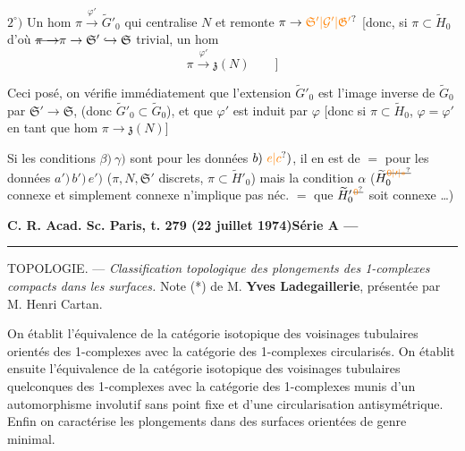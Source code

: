 \(2^\circ)\) Un hom \(\pi\xrightarrow{\varphi'}\widetilde G'_0\) qui centralise \(N\) et remonte \(\pi\to\unsure{\mathfrak{S}'|\mathcal{G}'|\mathfrak{G}'}\) [donc, si \(\pi\subset\widetilde H_0\) d'où \(\deleted{\pi\to}\pi\to\mathfrak{S}'\lhook\joinrel\to\mathfrak{S}\) trivial, un hom
\[
 \pi\xrightarrow{\varphi'}\mathfrak{z}(N)\qquad ]
\]

Ceci posé, on vérifie immédiatement que l'extension \(\widetilde G'_0\) est l'image inverse de \(\widetilde G_0\) par \(\mathfrak{S}'\to\mathfrak{S}\),  (donc \(\widetilde G'_0\subset\widetilde G_0\)), et que \(\varphi'\) est induit par \(\varphi\) [donc si \(\pi\subset\widetilde H_0\), \(\varphi=\varphi'\) en tant que hom \(\pi\to\mathfrak{z}(N)\)]

Si les conditions \deleted{\unsure{\(\alpha)\)}} \(\beta)\ \gamma)\) sont  pour les données  \(b)\ \unsure{e|c})\), il en est de \(=\) pour les données  \(a')\,b')\,e')\) (\(\pi,N,\mathfrak{S}'\) discrets, \(\pi\subset\widetilde H'_0\)) mais la condition \(\alpha\) (\(\widetilde H_0^{\deleted{\unsure{0|\prime|\ast}}}\) connexe et simplement connexe n'implique pas néc. \(=\) que \(\widetilde H'_0{}^{\deleted{\unsure{0}}}\) soit connexe \ldots)


\textbf{C. R. Acad. Sc. Paris, t. 279 (22 juillet 1974)}\hfill\textbf{Série A ---}\par\noindent\rule{\linewidth}{.35pt}\par

TOPOLOGIE. --- \textit{Classification topologique des plongements des 1-complexes compacts dans les surfaces.} Note (*) de M. \textbf{Yves Ladegaillerie}, présentée par M. Henri Cartan.

{\small On établit l'équivalence de la catégorie isotopique des voisinages tubulaires orientés des 1-complexes avec la catégorie des 1-complexes circularisés. On établit ensuite l'équivalence de la catégorie isotopique des voisinages tubulaires quelconques des 1-complexes avec la catégorie des 1-complexes munis d'un automorphisme involutif sans point fixe et d'une circularisation antisymétrique. Enfin on caractérise les plongements dans des surfaces orientées de genre minimal.}

